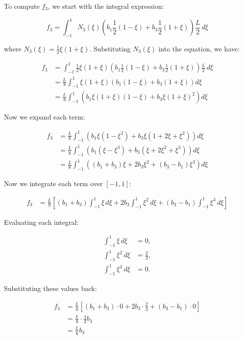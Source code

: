 \documentclass{article}
\begin{document}
To compute \( f_3 \), we start with the integral expression:

\begin{equation}
    f_3 = \int_{-1}^{1} N_3(\xi) \left( b_1 \frac{1}{2}(1 - \xi) + b_3 \frac{1}{2}(1 + \xi) \right) \frac{L}{2} \, d\xi
\end{equation}

where \( N_3(\xi) = \frac{1}{2} \xi (1 + \xi) \). Substituting \( N_3(\xi) \) into the equation, we have:

\begin{align*}
    f_3 &= \int_{-1}^{1} \frac{1}{2} \xi (1 + \xi) \left( b_1 \frac{1}{2}(1 - \xi) + b_3 \frac{1}{2}(1 + \xi) \right) \frac{L}{2} \, d\xi \\
    &= \frac{L}{8} \int_{-1}^{1} \xi (1 + \xi) \left( b_1(1 - \xi) + b_3(1 + \xi) \right) d\xi \\
    &= \frac{L}{8} \int_{-1}^{1} \left( b_1 \xi (1 + \xi)(1 - \xi) + b_3 \xi (1 + \xi)^2 \right) d\xi
\end{align*}

Now we expand each term:

\begin{align*}
    f_3 &= \frac{L}{8} \int_{-1}^{1} \left( b_1 \xi (1 - \xi^2) + b_3 \xi (1 + 2\xi + \xi^2) \right) d\xi \\
    &= \frac{L}{8} \int_{-1}^{1} \left( b_1 (\xi - \xi^3) + b_3 (\xi + 2\xi^2 + \xi^3) \right) d\xi \\
    &= \frac{L}{8} \int_{-1}^{1} \left( (b_1 + b_3) \xi + 2 b_3 \xi^2 + (b_3 - b_1) \xi^3 \right) d\xi
\end{align*}

Now we integrate each term over \([-1, 1]\):

\begin{align*}
    f_3 &= \frac{L}{8} \left[ (b_1 + b_3) \int_{-1}^{1} \xi \, d\xi + 2 b_3 \int_{-1}^{1} \xi^2 \, d\xi + (b_3 - b_1) \int_{-1}^{1} \xi^3 \, d\xi \right]
\end{align*}

Evaluating each integral:

\begin{align*}
    \int_{-1}^{1} \xi \, d\xi &= 0, \\
    \int_{-1}^{1} \xi^2 \, d\xi &= \frac{2}{3}, \\
    \int_{-1}^{1} \xi^3 \, d\xi &= 0.
\end{align*}

Substituting these values back:

\begin{align*}
    f_3 &= \frac{L}{8} \left[ (b_1 + b_3) \cdot 0 + 2 b_3 \cdot \frac{2}{3} + (b_3 - b_1) \cdot 0 \right] \\
    &= \frac{L}{8} \cdot \frac{4}{3} b_3 \\
    &= \frac{L}{6} b_3
\end{align*}
\end{document}
